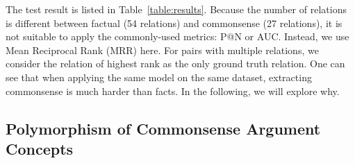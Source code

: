 The test result is listed in Table~\ref{table:results}. 
Because the number of relations is different between factual (54 relations) 
and commonsense (27 relations), it is not suitable to apply the commonly-used metrics: 
P@N or AUC. Instead, we use Mean Reciprocal Rank (MRR) here. 
For pairs with multiple relations, we consider the relation of highest rank 
as the only ground truth relation.
One can see that when applying the same model on the same dataset, extracting
commonsense is much harder than facts. In the following, we will explore
why.




\subsection{Polymorphism of Commonsense Argument Concepts}
\label{sec:polymorphism}

